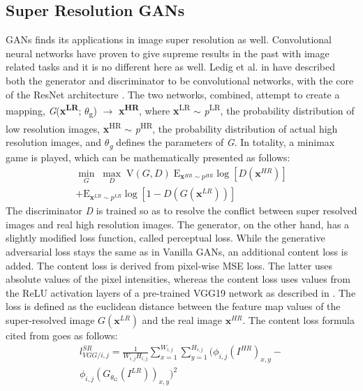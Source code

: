 \documentclass[10pt,journal,compsoc]{IEEEtran}
\begin{document}
\subsection{Super Resolution GANs}
GANs finds its applications in image super resolution as well. Convolutional neural networks have proven to give supreme results \cite{lecun2015lenet,krizhevsky2012imagenet,simonyan2014very} in the past with image related tasks and it is no different here as well. Ledig et al. in \cite{ledig2017photo} have described both the generator and discriminator to be convolutional networks, with the core of the ResNet architecture \cite{he2016deep}. The two networks, combined, attempt to create a mapping, \textit{G}(\textbf{x\textsuperscript{LR}}; $\theta$\textsubscript{g}) $\rightarrow$ \textbf{x\textsuperscript{HR}}, where \textbf{x}\textsuperscript{LR} $\sim$ \textit{p}\textsuperscript{LR}, the probability distribution of low resolution images, \textbf{x}\textsuperscript{HR} $\sim$  \textit{p}\textsuperscript{HR}, the probability distribution of actual high resolution images, and \textit{$\theta$\textsubscript{g}} defines the parameters of \textit{G}. In totality, a minimax game is played, which can be mathematically presented as follows:%
\begin{multline}
\mathop{min}_{G}\; \mathop{max}_{D}\; \mbox{V}(G,D)\; \mbox{E}_{\textbf{x}^{HR}\sim p^{HR}} \log[D(\textbf{x}^{HR})]\\
+ \mbox{E}_{\textbf{x}^{LR}\sim p^{LR}} \log[1 - \textit{D}({\textit{G}}(\textbf{x}^{LR}))]
\end{multline}
The discriminator \textit{D} is trained so as to resolve the conflict between super resolved images and real high resolution images. The generator, on the other hand, has a slightly modified loss function, called perceptual loss. While the generative adversarial loss stays the same as in Vanilla GANs, an additional content loss is added. The content loss is derived from pixel-wise MSE loss. The latter uses absolute values of the pixel intensities, whereas the content loss uses values from the ReLU activation layers of a pre-trained VGG19 network as described in \cite{simonyan2014very}. The loss is defined as the euclidean distance between the feature map values of the super-resolved image $\textit{G}(\textbf{x}^{LR})$ and the real image $\textbf{x}^{HR}$. The content loss formula cited from \cite{ledig2017photo} goes as follows:
\begin{multline}
l^{SR}_{VGG/i,j} = \frac{1}{W_{i,j}H_{i,j}} \sum_{x=1}^{W_{i,j}} \sum_{y=1}^{H_{i,j}} ( \phi_{i,j}(I^{HR})_{x,y} -\\
\phi_{i,j}(G_{\theta_{G}}(I^{LR}))_{x,y})^{2}
\end{multline}
\end{document}
